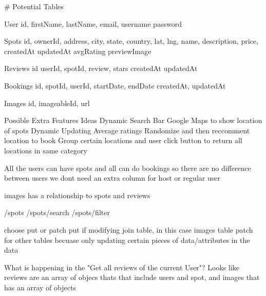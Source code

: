 # Potential Tables


User
    id,
    firstName,
    lastName,
    email,
    username
    password


Spots
    id,
    ownerId,
    address,
    city,
    state,
    country,
    lat,
    lng,
    name,
    description,
    price,
    createdAt
    updatedAt
    avgRating
    previewImage

Reviews
    id
    userId,
    spotId,
    review,
    stars
    createdAt
    updatedAt

Bookings
    id,
    spotId,
    userId,
    startDate,
    endDate
    createdAt,
    updatedAt

Images
    id,
    imageableId,
    url



Possible Extra Features Ideas
    Dynamic Search Bar
    Google Maps to show location of spots
    Dynamic Updating Average ratings
    Randomize and then reccomment location to book
    Group certain locations and user click button to return all locations in same category




All the users can have spots and all can do bookings so there are no difference between users
we dont need an extra column for host or regular user





images has a relationship to spots and reviews




/spots
/spots/search
/spots/filter



choose put or patch
put if modifying join table, in this case images table
patch for other tables becuase only updating certain pieces of data/attributes in the data

What is happening in the "Get all reviews of the current User"? Looks like reviews are an array of objecs thats that include users and spot, and images that has an array of objects